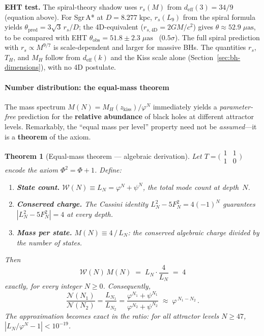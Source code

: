 \documentclass[12pt,a4paper]{article}
\newtheorem{theorem}{Theorem}[section]
\begin{document}
\noindent\textbf{EHT test.}  The spiral-theory shadow uses $r_s(M)$ from $d_{\mathrm{eff}}(3)=34/9$ (equation above). For Sgr\,A* at $D = 8.277\;\mathrm{kpc}$, $r_s(L_9)$ from the spiral formula yields $\theta_{\mathrm{pred}} = 3\sqrt{3}\,r_s/D$; the 4D-equivalent ($r_{s,4\mathrm{D}}=2GM/c^2$) gives $\theta \approx 52.9\;\mu\mathrm{as}$, to be compared with EHT $\theta_{\mathrm{obs}} = 51.8 \pm 2.3\;\mu\mathrm{as}$~\cite{EHT2022} ($0.5\sigma$). The full spiral prediction with $r_s \propto M^{9/7}$ is scale-dependent and larger for massive BHs. The quantities $r_s$, $T_H$, and $M_H$ follow from $d_{\mathrm{eff}}(k)$ and the Kiss scale alone (Section~\ref{sec:bh-dimensions}), with no 4D postulate.
\paragraph{Number distribution: the equal-mass theorem}
\label{sec:bh-number}

The mass spectrum $M(N) = M_H(z_{\mathrm{kiss}})/\varphi^N$ immediately yields a \emph{parameter-free} prediction for the \textbf{relative abundance} of black holes at different attractor levels.  Remarkably, the ``equal mass per level'' property need not be \emph{assumed}---it is a \textbf{theorem} of the axiom.

\begin{theorem}[Equal-mass theorem --- algebraic derivation]
\label{thm:equal-mass}
Let $T = \bigl(\begin{smallmatrix}1&1\\1&0\end{smallmatrix}\bigr)$ encode the axiom $\Phi^2=\Phi+1$.  Define:
\begin{enumerate}[nosep]
\item \textbf{State count.} $\mathcal{W}(N) \equiv L_N = \varphi^N + \psi^N$, the total mode count at depth~$N$.
\item \textbf{Conserved charge.} The Cassini identity $L_N^2 - 5F_N^2 = 4(-1)^N$ guarantees $|L_N^2 - 5F_N^2| = 4$ at \emph{every} depth.
\item \textbf{Mass per state.} $M(N) \equiv 4\,/\,L_N$: the conserved algebraic charge divided by the number of states.
\end{enumerate}
Then
\begin{equation}
\boxed{\mathcal{W}(N)\,M(N) \;=\; L_N \cdot \frac{4}{L_N} \;=\; 4}
\end{equation}
\emph{exactly}, for every integer $N \geq 0$.  Consequently,
\begin{equation}
\boxed{\frac{\mathcal{N}(N_1)}{\mathcal{N}(N_2)} = \frac{L_{N_1}}{L_{N_2}} = \frac{\varphi^{N_1}+\psi^{N_1}}{\varphi^{N_2}+\psi^{N_2}} \;\approx\; \varphi^{\,N_1 - N_2}\,.}
\end{equation}
The approximation becomes exact in the ratio: for all attractor levels $N \geq 47$, $|L_N/\varphi^N - 1| < 10^{-19}$.
\end{theorem}
\end{document}
